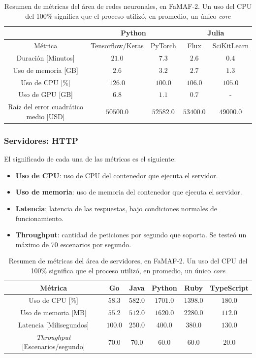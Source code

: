 \documentclass[11pt]{article}
\let\Oldsubsubsection\subsubsection
\renewcommand{\subsubsection}{\FloatBarrier\Oldsubsubsection}
\newcommand{\english}[1]{\textit{#1}}
\begin{document}
\begin{table}[H]
\centering
\begin{tabular}{|c|c|c|c|c|}
\hline
& \multicolumn{2}{c|}{Python} & \multicolumn{2}{c|}{Julia} \\ \hline
Métrica & Tensorflow/Keras & PyTorch & Flux & SciKitLearn \\ \hline
Duración [Minutos] & $21.0$ & $7.3$ & $2.6$ & $0.4$ \\ \hline
Uso de memoria [GB] & $2.6$ & $3.2$ & $2.7$ & $1.3$ \\ \hline
Uso de CPU [\%] & $126.0$ & $100.0$& $106.0$& $105.0$\\ \hline
Uso de GPU [GB] & $6.8$ & $1.1$ & $0.7$ & - \\ \hline
Raíz del error cuadrático medio [USD] & $50500.0$ & $52582.0$ & $53400.0$ & $49000.0$ \\ \hline
\end{tabular}
\caption{Resumen de métricas del área de redes neuronales, en FaMAF-2. Un uso del CPU del 100\% significa que el proceso utilizó, en promedio, un único \english{core}}
\label{tab:nn:famaf_2}
\end{table}

\subsubsection{Servidores: HTTP}

El significado de cada una de las métricas es el siguiente:

\begin{itemize}
    \item \textbf{Uso de CPU}: uso de CPU del contenedor que ejecuta el servidor.
    \item \textbf{Uso de memoria}: uso de memoria del contenedor que ejecuta el servidor.
    \item \textbf{Latencia}: latencia de las respuestas, bajo condiciones normales de funcionamiento.
    \item \textbf{Throughput}: cantidad de peticiones por segundo que soporta. Se testeó un máximo de 70 escenarios por segundo.
\end{itemize}

\begin{table}[H]
\centering
\begin{tabular}{|c|c|c|c|c|c|}
\hline
Métrica       & Go   & Java & Python & Ruby & TypeScript \\ \hline
Uso de CPU [\%]         & $58.3$ & $582.0$  & $1701.0$   & $1398.0$ & $180.0$        \\ \hline
Uso de memoria [MB]   & $55.2$ & $512.0$  & $1620.0$   & $2280.0$ & $112.0$        \\ \hline
Latencia [Milisegundos]   & $100.0$  & $250.0$  & $400.0$    & $380.0$  & $130.0$        \\ \hline
\english{Throughput} [Escenarios/segundo] & $70.0$   & $70.0$   & $60.0$     & $60.0$   & $20.0$         \\ \hline
\end{tabular}
\caption{Resumen de métricas del área de servidores, en FaMAF-2. Un uso del CPU del 100\% significa que el proceso utilizó, en promedio, un único \english{core} }
\label{tab:http:famaf_1}
\end{table}
\end{document}

